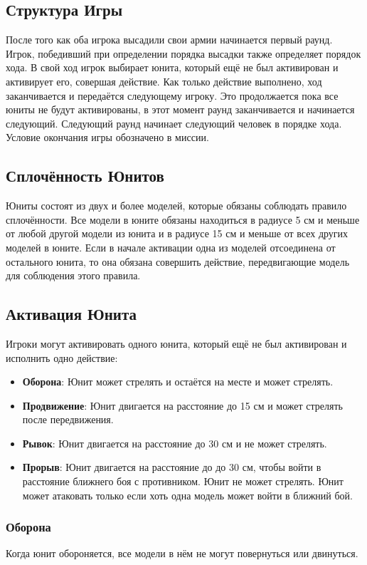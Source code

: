 \documentclass[twocolumn]{article}
\newcommand{\h}[1]{\textbf{#1}}
\begin{document}
\subsection{Структура Игры}
После того как оба игрока высадили свои армии начинается первый раунд. Игрок, победивший при определении порядка высадки также определяет порядок хода. В свой ход игрок выбирает юнита, который ещё не был активирован и активирует его, совершая действие. Как только действие выполнено, ход заканчивается и передаётся следующему игроку. Это продолжается пока все юниты не будут активированы, в этот момент раунд заканчивается и начинается следующий. Следующий раунд начинает следующий человек в порядке хода. Условие окончания игры обозначено в миссии.

\subsection{Сплочённость Юнитов}
Юниты состоят из двух и более моделей, которые обязаны соблюдать правило сплочённости.
Все модели в юните обязаны находиться в радиусе 5 см и меньше от любой другой модели из юнита и в радиусе 15 см и меньше от всех других моделей в юните. 
Если в начале активации одна из моделей отсоединена от остального юнита, то она обязана совершить действие, передвигающие модель для соблюдения этого правила.

\subsection{Активация Юнита}
Игроки могут активировать одного юнита, который ещё не был активирован и исполнить одно действие:
\begin{itemize}
    \item \h{Оборона}: Юнит может стрелять и остаётся на месте и может стрелять.
    \item \h{Продвижение}: Юнит двигается на расстояние до 15 см и может стрелять после передвижения.
    \item \h{Рывок}: Юнит двигается на расстояние до 30 см и не может стрелять.
    \item \h{Прорыв}: Юнит двигается на расстояние до до 30 см, чтобы войти в расстояние ближнего боя с противником. Юнит не может стрелять. Юнит может атаковать только если хоть одна модель может войти в ближний бой.
\end{itemize}

\newpage


\subsubsection{Оборона}
Когда юнит обороняется, все модели в нём не могут повернуться или двинуться.
\end{document}

